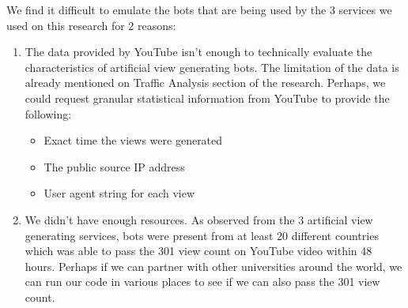 \documentclass[conference]{IEEEtran}
\begin{document}
We find it difficult to emulate the bots that are being used by the 3 services we used on this research for 2 reasons:

\begin{enumerate}
  \item The data provided by YouTube isn’t enough to technically evaluate the characteristics of artificial view generating bots. The limitation of the data is already mentioned on Traffic Analysis section of the research. Perhaps, we could request granular statistical information from YouTube to provide the following:
  \begin{itemize}
    \item Exact time the views were generated
    \item The public source IP address
    \item User agent string for each view
  \end{itemize}
  \item We didn’t have enough resources. As observed from the 3 artificial view generating services, bots were present from at least 20 different countries which was able to pass the 301 view count on YouTube video within 48 hours. Perhaps if we can partner with other universities around the world, we can run our code in various places to see if we can also pass the 301 view count.
\end{enumerate}




\end{document}
